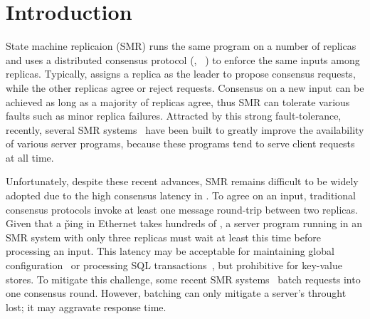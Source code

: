 \section{Introduction} \label{sec:intro}

State machine replicaion (SMR) runs the same program on a 
number of replicas and uses a distributed consensus protocol (\eg, 
\paxos~\cite{crane:sosp15}) to enforce the same inputs among 
replicas. Typically, \paxos assigns a replica as the leader to propose 
consensus requests, while the other replicas agree or reject requests. 
Consensus on a new input can be achieved as long as a majority of replicas 
agree, thus SMR can tolerate various faults such as minor replica 
failures. Attracted by this strong fault-tolerance, recently, several SMR 
systems~\cite{chubby:osdi, zookeeper, crane:sosp15, eve:osdi12, rex:eurosys14} 
have been built to greatly improve the availability of various server programs, 
because these programs tend to serve client requests at all time.

Unfortunately, despite these recent advances, SMR remains difficult to be 
widely adopted due to the high consensus latency in \paxos. To agree on an 
input, traditional consensus protocols invoke at least one message round-trip 
between two replicas. Given that a \v{ping} in Ethernet takes hundreds of \us, a 
server program running in an SMR system with only three replicas must wait at 
least this time before processing an input. This latency may be acceptable for 
maintaining global configuration~\cite{chubby:osdi,zookeeper} or processing SQL 
transactions~\cite{crane:sosp15,eve:osdi12}, but prohibitive for 
key-value stores. To mitigate this challenge, some recent SMR 
systems~\cite{calvin:sigmod12,rex:eusorys14} batch requests into one 
consensus round. However, batching can only mitigate a server's throught lost; 
it may aggravate response time.


